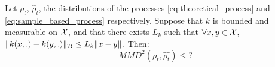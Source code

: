 

\begin{proposition} Let $\rho_t$, $\widehat{\rho}_t$, the distributions of the processes \eqref{eq:theoretical_process} and \eqref{eq:sample_based_process} respectively. Suppose that $k$ is bounded and measurable on ${{\mathcal X}}$, and that there exists $L_k$ such that $\forall x,y \in {{\mathcal X}}$, $\| k(x,.)-k(y,.) \|_{{{\mathcal H}}}\le L_k \|x-y\|$. Then:
	\begin{equation}
	MMD^2(\rho_t,\widehat{\rho_t})\le ?%
	\end{equation}
\end{proposition}
